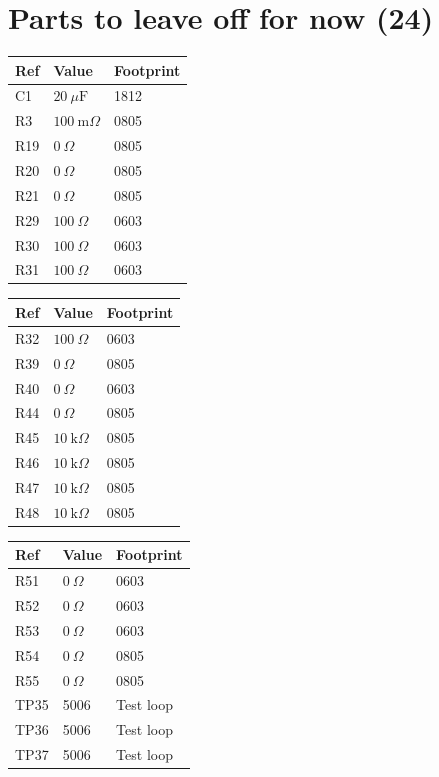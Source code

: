 \documentclass[10pt,letterpaper]{article}
\begin{document}
\section*{Parts to leave off for now (24)}
\noindent \begin{tabular}[t]{@{}lll@{}}\toprule Ref & Value & Footprint\\\midrule
C1 & $20\:\mu\text{F}$ & 1812\\
R3 & $100\:\text{m}\Omega$ & 0805\\
R19 & $0\:\Omega$ & 0805\\
R20 & $0\:\Omega$ & 0805\\
R21 & $0\:\Omega$ & 0805\\
R29 & $100\:\Omega$ & 0603\\
R30 & $100\:\Omega$ & 0603\\
R31 & $100\:\Omega$ & 0603\\
\bottomrule\end{tabular}\hfill
\begin{tabular}[t]{@{}lll@{}}\toprule Ref & Value & Footprint\\\midrule
R32 & $100\:\Omega$ & 0603\\
R39 & $0\:\Omega$ & 0805\\
R40 & $0\:\Omega$ & 0603\\
R44 & $0\:\Omega$ & 0805\\
R45 & $10\:\text{k}\Omega$ & 0805\\
R46 & $10\:\text{k}\Omega$ & 0805\\
R47 & $10\:\text{k}\Omega$ & 0805\\
R48 & $10\:\text{k}\Omega$ & 0805\\
\bottomrule\end{tabular}\hfill
\begin{tabular}[t]{@{}lll@{}}\toprule Ref & Value & Footprint\\\midrule
R51 & $0\:\Omega$ & 0603\\
R52 & $0\:\Omega$ & 0603\\
R53 & $0\:\Omega$ & 0603\\
R54 & $0\:\Omega$ & 0805\\
R55 & $0\:\Omega$ & 0805\\
TP35 & 5006 & Test loop\\
TP36 & 5006 & Test loop\\
TP37 & 5006 & Test loop\\
\bottomrule\end{tabular}
\end{document}
